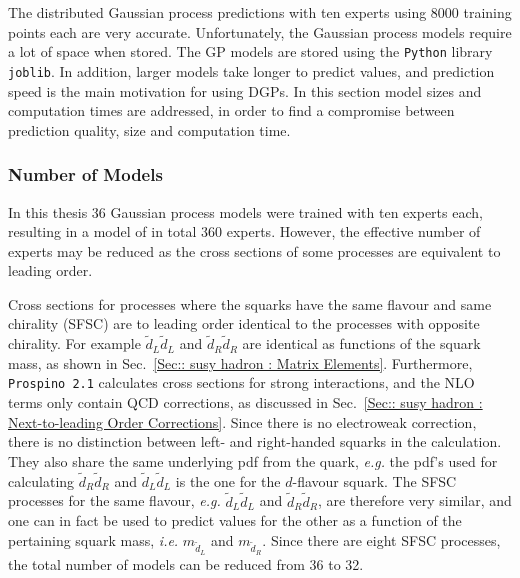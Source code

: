 \documentclass[twoside,english]{uiofysmaster}
\begin{document}
{{The distributed Gaussian process predictions with ten experts using 8000 training points each are very accurate. Unfortunately, the Gaussian process models require a lot of space when stored. The GP models are stored using the \verb|Python| library \verb|joblib|. In addition, larger models take longer to predict values, and prediction speed is the main motivation for using DGPs. In this section model sizes and computation times are addressed, in order to find a compromise between prediction quality, size and computation time.

\subsubsection{Number of Models}

In this thesis 36 Gaussian process models were trained with ten experts each, resulting in a model of in total 360 experts. However, the effective number of experts may be reduced as the cross sections of some processes are equivalent to leading order. 


Cross sections for processes where the squarks have the same flavour and same chirality (SFSC) are to leading order identical to the processes with opposite chirality. For example $\widetilde{d}_L \widetilde{d}_L$ and $\widetilde{d}_R \widetilde{d}_R$ are identical as functions of the squark mass, as shown in Sec.~\ref{Sec:: susy hadron : Matrix Elements}. Furthermore, \verb|Prospino 2.1| calculates cross sections for strong interactions, and the NLO terms only contain QCD corrections, as discussed in Sec.~\ref{Sec:: susy hadron : Next-to-leading Order Corrections}. Since there is no electroweak correction, there is no distinction between left- and right-handed squarks in the calculation. They also share the same underlying pdf from the quark, \textit{e.g.} the pdf's used for calculating $\widetilde{d}_R \widetilde{d}_R$ and $\widetilde{d}_L \widetilde{d}_L$ is the one for the $d$-flavour squark. The SFSC processes for the same flavour, \textit{e.g.} $\widetilde{d}_L \widetilde{d}_L$ and $\widetilde{d}_R \widetilde{d}_R$, are therefore very similar, and one can in fact be used to predict values for the other as a function of the pertaining squark mass, \textit{i.e.} $m_{\widetilde{d}_L}$ and $m_{\widetilde{d}_R}$. Since there are eight SFSC processes, the total number of models can be reduced from 36 to 32.

}}
\end{document}
